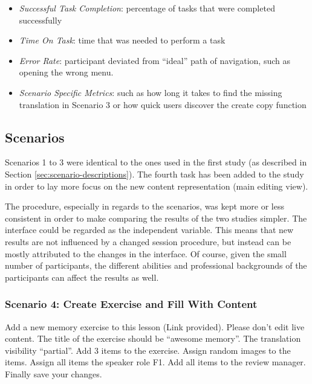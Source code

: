 \begin{itemize}
 \item{\emph{Successful Task Completion}: percentage of tasks that were completed successfully}
 \item{\emph{Time On Task}: time that was needed to perform a task}
 \item{\emph{Error Rate}: participant deviated from “ideal” path of navigation, such as opening the wrong menu.}
 \item{\emph{Scenario Specific Metrics}: such as how long it takes to find the missing translation in Scenario 3 or how quick users discover the create copy function}
\end{itemize}

\subsection{Scenarios}
Scenarios 1 to 3 were identical to the ones used in the first study (as described in Section \ref{sec:scenario-descriptions}). The fourth task has been added to the study in order to lay more focus on the new content representation (main editing view).

The procedure, especially in regards to the scenarios, was kept more or less consistent in order to make comparing the results of the two studies simpler. The interface could be regarded as the independent variable. This means that new results are not influenced by a changed session procedure, but instead can be mostly attributed to the changes in the interface. Of course, given the small number of participants, the different abilities and professional backgrounds of the participants can affect the results as well.

\subsubsection{Scenario 4: Create Exercise and Fill With Content} Add a new memory exercise to this lesson (Link provided). Please don’t edit live content. The title of the exercise should be “awesome memory”. The translation visibility “partial”. Add 3 items to the exercise. Assign random images to the items. Assign all items the speaker role F1. Add all items to the review manager. Finally save your changes.

